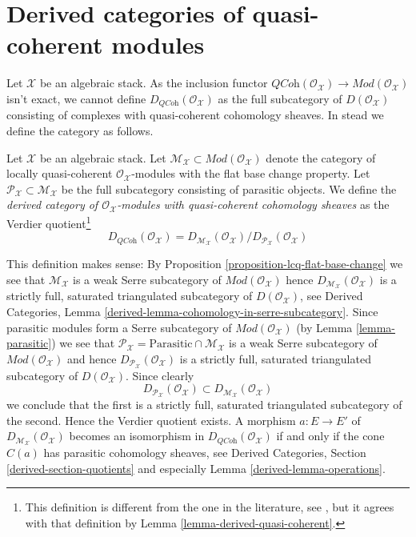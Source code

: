 \section{Derived categories of quasi-coherent modules}
\label{section-derived}

\noindent
Let $\mathcal{X}$ be an algebraic stack. As the inclusion functor
$\textit{QCoh}(\mathcal{O}_\mathcal{X}) \to
\textit{Mod}(\mathcal{O}_\mathcal{X})$ isn't exact, we cannot define
$D_{\textit{QCoh}}(\mathcal{O}_\mathcal{X})$ as the full subcategory
of $D(\mathcal{O}_\mathcal{X})$ consisting of complexes with quasi-coherent
cohomology sheaves. In stead we define the category as follows.

\begin{definition}
\label{definition-derived}
Let $\mathcal{X}$ be an algebraic stack. Let
$\mathcal{M}_\mathcal{X} \subset \textit{Mod}(\mathcal{O}_\mathcal{X})$
denote the category of locally quasi-coherent
$\mathcal{O}_\mathcal{X}$-modules with the flat base change property.
Let $\mathcal{P}_\mathcal{X} \subset \mathcal{M}_\mathcal{X}$
be the full subcategory consisting of parasitic objects.
We define the {\it derived category of $\mathcal{O}_\mathcal{X}$-modules with
quasi-coherent cohomology sheaves} as the Verdier quotient\footnote{This
definition is different from the one in the literature, see
\cite[6.3]{olsson_sheaves}, but it agrees with that definition
by Lemma \ref{lemma-derived-quasi-coherent}.}
$$
D_{\textit{QCoh}}(\mathcal{O}_\mathcal{X}) =
D_{\mathcal{M}_\mathcal{X}}(\mathcal{O}_\mathcal{X})/
D_{\mathcal{P}_\mathcal{X}}(\mathcal{O}_\mathcal{X})
$$
\end{definition}

\noindent
This definition makes sense: By
Proposition \ref{proposition-lcq-flat-base-change}
we see that $\mathcal{M}_\mathcal{X}$ is a weak Serre subcategory
of $\textit{Mod}(\mathcal{O}_\mathcal{X})$
hence $D_{\mathcal{M}_\mathcal{X}}(\mathcal{O}_\mathcal{X})$
is a strictly full, saturated triangulated subcategory of
$D(\mathcal{O}_\mathcal{X})$, see
Derived Categories, Lemma \ref{derived-lemma-cohomology-in-serre-subcategory}.
Since parasitic modules form a Serre subcategory of
$\textit{Mod}(\mathcal{O}_\mathcal{X})$ (by
Lemma \ref{lemma-parasitic}) we see that
$\mathcal{P}_\mathcal{X} = \text{Parasitic} \cap \mathcal{M}_\mathcal{X}$
is a weak Serre subcategory of $\textit{Mod}(\mathcal{O}_\mathcal{X})$ and
hence $D_{\mathcal{P}_\mathcal{X}}(\mathcal{O}_\mathcal{X})$
is a strictly full, saturated triangulated subcategory of
$D(\mathcal{O}_\mathcal{X})$. Since clearly
$$
D_{\mathcal{P}_\mathcal{X}}(\mathcal{O}_\mathcal{X})
\subset
D_{\mathcal{M}_\mathcal{X}}(\mathcal{O}_\mathcal{X})
$$
we conclude that the first is a strictly full, saturated triangulated
subcategory of the second. Hence the Verdier quotient exists. A morphism
$a : E \to E'$ of
$D_{\mathcal{M}_\mathcal{X}}(\mathcal{O}_\mathcal{X})$ becomes an
isomorphism in $D_{\textit{QCoh}}(\mathcal{O}_\mathcal{X})$ if and
only if the cone $C(a)$ has parasitic cohomology sheaves, see
Derived Categories, Section \ref{derived-section-quotients} and especially
Lemma \ref{derived-lemma-operations}.

